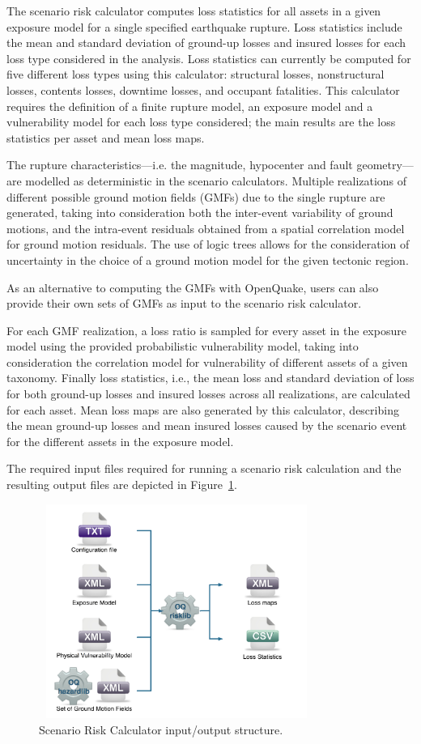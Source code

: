 The scenario risk calculator computes loss statistics for all assets in a
given exposure model for a single specified earthquake rupture. Loss
statistics include the mean and standard deviation of ground-up losses and
insured losses for each loss type considered in the analysis. Loss statistics
can currently be computed for five different loss types using this calculator:
structural losses, nonstructural losses, contents losses, downtime losses, and
occupant fatalities. This calculator requires the definition of a finite
rupture model, an exposure model and a vulnerability model for each loss type
considered; the main results are the loss statistics per asset and mean loss
maps.

The rupture characteristics---i.e. the magnitude, hypocenter and fault
geometry---are modelled as deterministic in the scenario calculators. Multiple
realizations of different possible ground motion fields (GMFs) due to the
single rupture are generated, taking into consideration both the inter-event
variability of ground motions, and the intra-event residuals obtained from a
spatial correlation model for ground motion residuals. The use of logic trees
allows for the consideration of uncertainty in the choice of a ground motion
model for the given tectonic region.

As an alternative to computing the GMFs with OpenQuake, users can also provide
their own sets of GMFs as input to the scenario risk calculator.

For each GMF realization, a loss ratio is sampled for every asset in the
exposure model using the provided probabilistic vulnerability model, taking
into consideration the correlation model for vulnerability of different assets
of a given taxonomy. Finally loss statistics, i.e., the mean loss and standard
deviation of loss for both ground-up losses and insured losses across all
realizations, are calculated for each asset. Mean loss maps are also generated
by this calculator, describing the mean ground-up losses and mean insured
losses caused by the scenario event for the different assets in the exposure
model.

The required input files required for running a scenario risk calculation and
the resulting output files are depicted in Figure~\ref{fig:io-structure-scenario-risk}.

\begin{figure}[ht]
\centering
\includegraphics[width=9cm,height=7cm]{figures/risk/io-structure-scenario-risk.pdf}
\caption{Scenario Risk Calculator input/output structure.}
\label{fig:io-structure-scenario-risk}
\end{figure}